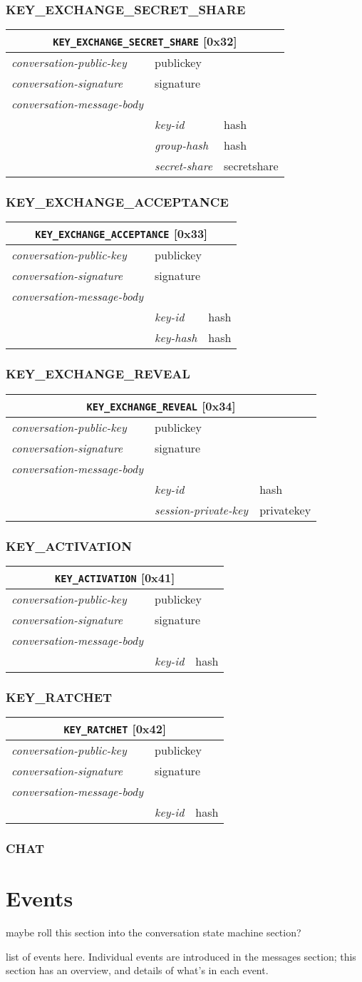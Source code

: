 \documentclass{article}
\def\message#1{\texttt{#1}}
\def\field#1{\textit{#1}}
\newenvironment{conversationmessage}[2]{
\newcommand{\messagefield}[2]{
& \field{##1} & \textsf{##2} \\
\hline
}
\begin{tabular}{|l|l|l|}
\hline
\multicolumn{3}{|c|}{\message{#1} [#2]} \\
\hline
\hline
\field{conversation-public-key} & \multicolumn{2}{l|}{\textsf{publickey}} \\
\hline
\field{conversation-signature} & \multicolumn{2}{l|}{\textsf{signature}} \\
\hline
\field{conversation-message-body} & \multicolumn{2}{l|}{} \\
\hline
}{
\end{tabular}
}
\begin{document}
\subsubsection{KEY\_EXCHANGE\_SECRET\_SHARE}

\begin{conversationmessage}{KEY\_EXCHANGE\_SECRET\_SHARE}{0x32}
\messagefield{key-id}{hash}
\messagefield{group-hash}{hash}
\messagefield{secret-share}{secretshare}
\end{conversationmessage}

\subsubsection{KEY\_EXCHANGE\_ACCEPTANCE}

\begin{conversationmessage}{KEY\_EXCHANGE\_ACCEPTANCE}{0x33}
\messagefield{key-id}{hash}
\messagefield{key-hash}{hash}
\end{conversationmessage}

\subsubsection{KEY\_EXCHANGE\_REVEAL}

\begin{conversationmessage}{KEY\_EXCHANGE\_REVEAL}{0x34}
\messagefield{key-id}{hash}
\messagefield{session-private-key}{privatekey}
\end{conversationmessage}

\subsubsection{KEY\_ACTIVATION}

\begin{conversationmessage}{KEY\_ACTIVATION}{0x41}
\messagefield{key-id}{hash}
\end{conversationmessage}

\subsubsection{KEY\_RATCHET}

\begin{conversationmessage}{KEY\_RATCHET}{0x42}
\messagefield{key-id}{hash}
\end{conversationmessage}

\subsubsection{CHAT}




\section{Events}
maybe roll this section into the conversation state machine section?

list of events here. Individual events are introduced in the messages section; this section has an overview, and details of what's in each event.




\end{document}
